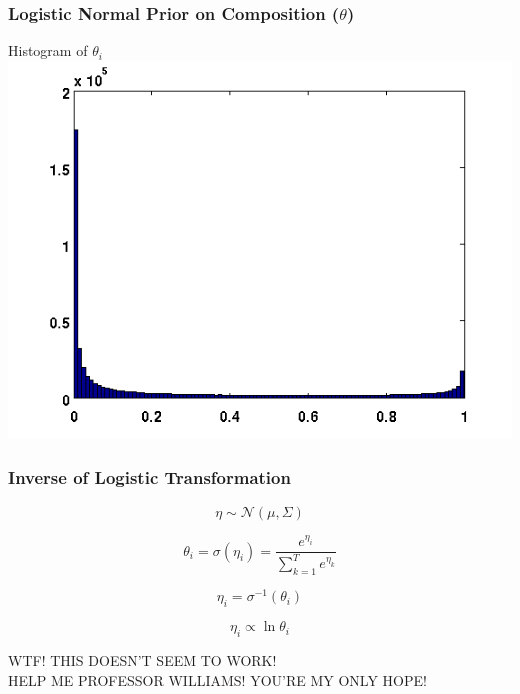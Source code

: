 \begin{frame}
  \frametitle{Logistic Normal Prior on Composition ($\theta$)}
  \begin{center}
    Histogram of $\theta_i$
    \includegraphics[scale=0.6]{img/log-normal-figs/hist-2.png}
  \end{center}
\end{frame}

\begin{frame}
  \frametitle{Inverse of Logistic Transformation}
  \begin{center}
    \begin{equation*}
      \eta \sim \mathcal{N}(\mu, \Sigma)
    \end{equation*}

    \begin{equation*}
      \theta_i = \sigma(\eta_i) = \frac{e^{\eta_i}}{\sum_{k=1}^{T}e^{\eta_k}}
    \end{equation*}

    \begin{equation*}
      \eta_i = \sigma^{-1}(\theta_i)
    \end{equation*}

    \begin{equation*}
      \eta_i \propto \ln \theta_i
    \end{equation*}

    WTF! THIS DOESN'T SEEM TO WORK! \\
    HELP ME PROFESSOR WILLIAMS! YOU'RE MY ONLY HOPE!
  \end{center}
\end{frame}
